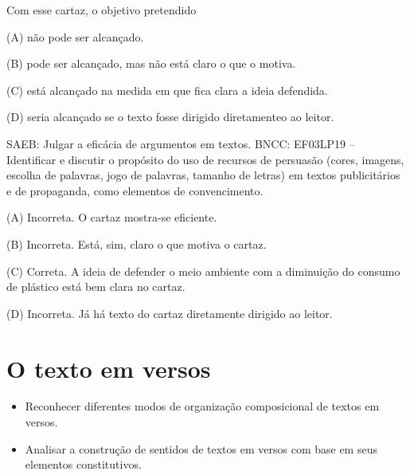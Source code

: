 \begin{boxlist}
{

Com esse cartaz, o objetivo pretendido

(A) não pode ser alcançado.

(B) pode ser alcançado, mas não está claro o que o motiva.

(C) está alcançado na medida em que fica clara a ideia defendida.

(D) seria alcançado se o texto fosse dirigido diretamenteo ao leitor.

SAEB: Julgar a eficácia de argumentos em textos.
BNCC: EF03LP19 -- Identificar e discutir o propósito do uso de recursos de
persuasão (cores, imagens, escolha de palavras, jogo de palavras,
tamanho de letras) em textos publicitários e de propaganda, como
elementos de convencimento.

(A) Incorreta. O cartaz mostra-se eficiente.

(B) Incorreta. Está, sim, claro o que motiva o cartaz.

(C) Correta. A ideia de defender o meio ambiente com a diminuição do consumo de plástico está bem clara no cartaz.

(D) Incorreta. Já há texto do cartaz diretamente dirigido ao leitor.

\chapter{O texto em versos}



\begin{itemize}
  \item Reconhecer diferentes modos de organização composicional de
textos em versos.
  \item Analisar a construção de sentidos de textos em versos com base
em seus elementos constitutivos.
\end{itemize}

}
\end{boxlist}
